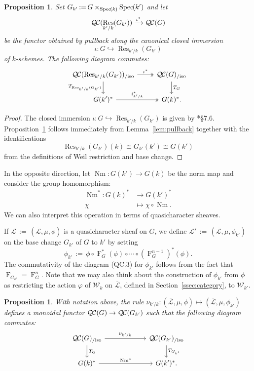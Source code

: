 \documentclass[10pt]{amsart}
\theoremstyle{plain}
\newtheorem{proposition}[theorem]{Proposition}
\theoremstyle{definition}
\theoremstyle{remark}
\newcommand{\Weil}[1]{\mathcal{W}_{#1}}
\newcommand{\Frob}[1]{\operatorname{F}_{#1}}
\DeclareMathOperator{\Res}{Res}
\DeclareMathOperator{\Nm}{Nm}
\newcommand{\Spec}[1]{{\operatorname{Spec}\hskip-1pt( #1 )}}
\newcommand{\ceq}{{\, :=\, }}
\newcommand{\TrFrob}[1]{T_{#1}}
\newcommand{\qcs}[1]{{\mathcal{#1}}}
\newcommand{\gqcs}[1]{{\mathcal{\bar #1}}}
\newcommand{\QC}{{\mathcal{Q\hskip-0.8pt C}}}
\newcommand{\QCiso}[1]{\QC(#1)_{/\text{iso}}}
\begin{document}
\begin{proposition} \label{prop:csbe}
Set $G_{k'} \ceq G\times_\Spec{k} \Spec{k'}$ and let
\[
\QC(\Res_{k'/k}(G_{k'})) \xrightarrow{\iota^*} \QC(G)
\]
be the functor obtained by pullback along the canonical closed immersion 
\[\iota : G \hookrightarrow \Res_{k'/k}(G_{k'})\] of $k$-schemes.
The following diagram commutes:
\[
\begin{tikzcd}
\QCiso{\Res_{k'/k}(G_{k'})} \arrow[two heads]{r}{\iota^*} \dar[swap]{\TrFrob{\Res_{k'/k}(G_{k'})}} & \QCiso{G} \dar{\TrFrob{G}} \\
G(k')^* \arrow[two heads]{r}{i_{k'/k}^*} & G(k)^*.
\end{tikzcd}
\]
\end{proposition}
\begin{proof}
The closed immersion $\iota : G \hookrightarrow \Res_{k'/k}(G_{k'})$ is given by \cite{bosch-lutkebohmert-reynaud:NeronModels}*{\S 7.6}.
Proposition~\ref{prop:csbe} follows immediately from Lemma~\ref{lem:pullback} together with the identifications
\[
\Res_{k'/k}(G_{k'})(k) \cong G_{k'}(k') \cong G(k')
\]
from the definitions of Weil restriction and base change.
\end{proof}

In the opposite direction, let $\Nm : G(k') \to G(k)$ be the norm map and consider the group homomorphism:
\begin{align*}
\Nm^* : G(k)^* &\to G(k')^* \\
\chi &\mapsto \chi\circ \Nm.
\end{align*}
We can also interpret this operation in terms of quasicharacter sheaves.

If $\qcs{L} \ceq (\gqcs{L}, \mu, \phi)$ is a quasicharacter sheaf on $G$, we define
$\qcs{L}' \ceq (\gqcs{L}, \mu, \phi_{k'})$ on the base change
$G_{k'}$ of $G$ to $k'$ by setting
\[
\phi_{k'} \ceq \phi \circ \Frob{G}^*(\phi) \circ \cdots \circ (\Frob{G}^{n-1})^*(\phi).
\]
The commutativity of the diagram (QC.3) for $\phi_{k'}$
follows from the fact that $\Frob{G_{k'}} = \Frob{G}^n$.
Note that we may also think about the construction of $\phi_{k'}$ from $\phi$
as restricting the action $\varphi$ of $\Weil{k}$ on $\gqcs{L}$,
defined in Section~\ref{ssec:category}, to $\Weil{k'}$.

\begin{proposition}\label{prop:basechange}
With notation above,
the rule $\nu_{k'/k}: (\gqcs{L}, \mu, \phi) \mapsto (\gqcs{L}, \mu, \phi_{k'})$
 defines a monoidal functor $\QC(G) \to \QC(G_{k'})$
 such that the following diagram commutes:
\[
\begin{tikzcd}[column sep=60]
\QCiso{G} \rar{\nu_{k'/k}} \dar{\TrFrob{G}} & \QCiso{G_{k'}} \dar{\TrFrob{G_{k'}}} \\
G(k)^*  \rar{\Nm^*} & G(k')^*.
\end{tikzcd}
\]
\end{proposition}
\end{document}
